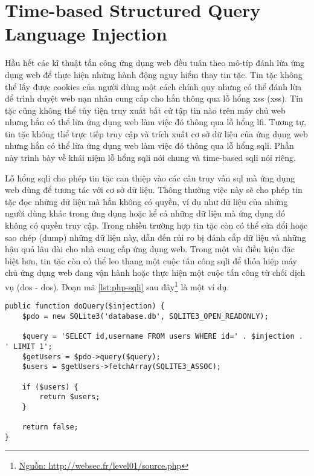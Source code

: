 \section{Time-based Structured Query Language Injection}
Hầu hết các kĩ thuật tấn công ứng dụng web đều tuân theo mô-típ đánh lừa ứng dụng web để thực hiện những hành động nguy hiểm thay tin tặc. Tin tặc không thể lấy được cookies của người dùng một cách chính quy nhưng có thể đánh lừa để trình duyệt web nạn nhân cung cấp cho hắn thông qua lỗ hổng \acrlong{xss} (\acrshort{xss}). Tin tặc cũng không thể tùy tiện truy xuất bất cứ tập tin nào trên máy chủ web nhưng hắn có thể lừa ứng dụng web làm việc đó thông qua lỗ hổng \acrshort{lfi}. Tương tự, tin tặc không thể trực tiếp truy cập và trích xuất cơ sở dữ liệu của ứng dụng web nhưng hắn có thể lừa ứng dụng web làm việc đó thông qua lỗ hổng \acrfull{sqli}. Phần này trình bày về khái niệm lỗ hổng \acrshort{sqli} nói chung và time-based \acrshort{sqli} nói riêng.\par
Lỗ hổng \acrfull{sqli} \parencite{li2011survey,sullivan2011web} cho phép tin tặc can thiệp vào các câu truy vấn \acrshort{sql} mà ứng dụng web dùng để tương tác với cơ sở dữ liệu. Thông thường việc này sẽ cho phép tin tặc đọc những dữ liệu mà hắn không có quyền, ví dụ như dữ liệu của những người dùng khác trong ứng dụng hoặc kể cả những dữ liệu mà ứng dụng đó không có quyền truy cập. Trong nhiều trường hợp tin tặc còn có thể sửa đổi hoặc sao chép (dump) những dữ liệu này, dẫn đến rủi ro bị đánh cắp dữ liệu và những hậu quả lâu dài cho nhà cung cấp ứng dụng web. Trong một vài điều kiện đặc biệt hơn, tin tặc còn có thể leo thang một cuộc tấn công \acrshort{sqli} để thỏa hiệp máy chủ ứng dụng web đang vận hành hoặc thực hiện một cuộc tấn công từ chối dịch vụ (\acrshort{dos} - \acrlong{dos}). Đoạn mã \ref{lst:php-sqli} sau đây\footnote{\href{http://websec.fr/level01/source.php}{Nguồn: http://websec.fr/level01/source.php}} là một ví dụ.
\begin{lstlisting}[style=PHP, label={lst:php-sqli},caption={Đoạn mã PHP có lỗ hổng SQL Injection}]
public function doQuery($injection) {
    $pdo = new SQLite3('database.db', SQLITE3_OPEN_READONLY);
    
    $query = 'SELECT id,username FROM users WHERE id=' . $injection . ' LIMIT 1';
    $getUsers = $pdo->query($query);
    $users = $getUsers->fetchArray(SQLITE3_ASSOC);

    if ($users) {
        return $users;
    }

    return false;
}
\end{lstlisting}
